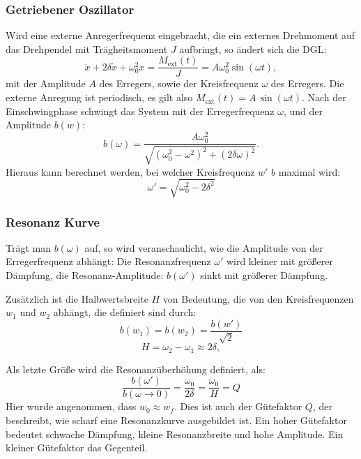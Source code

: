 \subsubsection{Getriebener Oszillator}
Wird eine externe Anregerfrequenz eingebracht, die ein externes Drehmoment auf das Drehpendel mit Trägheitsmoment \(J\) aufbringt, so ändert sich die DGL:
\begin{equation}
\ddot{x} + 2\delta \dot{x} + \omega_0^2 x = \frac{M_{\text{ext}}(t)}{J} = A \omega_0^2 \sin(\omega t),
\end{equation}
mit der Amplitude \(A\) des Erregers, sowie der Kreisfrequenz \(\omega\) des Erregers. Die externe Anregung ist periodisch, es gilt also \(M_{\text{ext}}(t)=A\,\sin(\omega t)\). Nach der Einschwingphase schwingt das System mit der Erregerfrequenz \(\omega\), und der Amplitude \(b(w)\):
\begin{equation}
b(\omega) = \frac{A \omega_0^2}{\sqrt{(\omega_0^2 - \omega^2)^2 + (2 \delta \omega)^2}}.
\end{equation}
Hieraus kann berechnet werden, bei welcher Kreisfrequenz \(w'\) \(b\) maximal wird:
\begin{equation}
\omega' = \sqrt{\omega_0^2 - 2 \delta^2}
\label{eq:w'}
\end{equation}

\subsubsection{Resonanz Kurve}
Trägt man \(b(\omega)\) auf, so wird veranschaulicht, wie die Amplitude von der Erregerfrequenz abhängt: Die Resonanzfrequenz \(\omega'\) wird kleiner mit größerer Dämpfung,
die Resonanz-Amplitude: \(b(\omega')\) sinkt mit größerer Dämpfung. 

Zusätzlich ist die Halbwertsbreite \(H\) von Bedeutung, die von den Kreisfrequenzen \(w_1\) und \(w_2\) abhängt, die definiert sind durch: 
\begin{equation}
    b(w_1)=b(w_2)=\frac{b(w')}{\sqrt{2}}
    \label{eq:b(H)}
\end{equation}
\begin{equation}
    H = \omega_2 - \omega_1 \approx 2\delta,
    \label{eq:H}
\end{equation}


Als letzte Größe wird die Resonanzüberhöhung definiert, als:
\begin{equation}
    \frac{b(\omega')}{b(\omega \to 0)} = \frac{\omega_0}{2 \delta}=\frac{\omega_0}{H}=Q
    \label{eq:reso_überhöhung}
\end{equation}
Hier wurde angenommen, dass \(w_0\approx w_f\). Dies ist auch der Gütefaktor \(Q\), der beschreibt, wie \glqq scharf\grqq{} eine Resonanzkurve ausgebildet ist. Ein hoher Gütefaktor bedeutet schwache Dämpfung, kleine Resonanzbreite und hohe Amplitude. Ein kleiner Gütefaktor das Gegenteil.